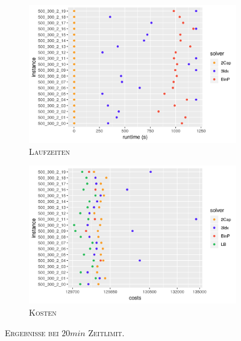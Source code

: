 \begin{figure}[H]
\centering
\begin{subfigure}[b]{0.4\textwidth}
\centering
\includegraphics[width=1.3\textwidth]{img/solver_instance_time_b=2_l_1200s.png}
\caption{\textsc{Laufzeiten}}
\label{fig:b=2_l_runtimes}
\end{subfigure}
\hfill
\begin{subfigure}[b]{0.4\textwidth}
\centering
\includegraphics[width=1.3\textwidth]{img/solver_instance_cost_b=2_l_1200s.png}
\caption{\textsc{Kosten}}
\label{fig:b=2_l_costs}
\end{subfigure}
\caption{\textsc{Ergebnisse bei $20min$ Zeitlimit}.}
\label{fig:res_plots_b=2_l}
\end{figure}


